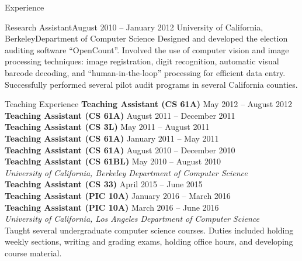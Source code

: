 \documentclass{resume}
\begin{document}
\begin{component}{Experience}
\vspace{-3.25em}

    \begin{position}{Research Assistant}{August 2010 -- January 2012}
        {University of California, Berkeley}{Department of Computer Science}
    {Designed and developed the election auditing software ``OpenCount''.
Involved the use of computer vision and image processing techniques: image registration, digit recognition, automatic visual barcode decoding, and ``human-in-the-loop'' processing for efficient data entry.
Successfully performed several pilot audit programs in several California counties.}
    \end{position}
    
\end{component}

\vspace{-1.5em}

\begin{component}{Teaching Experience}
    \textbf{Teaching Assistant (CS 61A)} \hfill May 2012 -- August 2012 \\
    \textbf{Teaching Assistant (CS 61A)} \hfill August 2011 -- December 2011 \\
    \textbf{Teaching Assistant (CS 3L)} \hfill May 2011 -- August 2011 \\
    \textbf{Teaching Assistant (CS 61A)} \hfill January 2011 -- May 2011 \\
    \textbf{Teaching Assistant (CS 61A)} \hfill August 2010 -- December 2010 \\
    \textbf{Teaching Assistant (CS 61BL)} \hfill May 2010 -- August 2010 \\
        \textit{University of California, Berkeley \hfill Department of Computer Science}\\
    \textbf{Teaching Assistant (CS 33)} \hfill April 2015 -- June 2015 \\
    \textbf{Teaching Assistant (PIC 10A)} \hfill January 2016 -- March 2016 \\
    \textbf{Teaching Assistant (PIC 10A)} \hfill March 2016 -- June 2016 \\
        \textit{University of California, Los Angeles \hfill Department of Computer Science}\\
    Taught several undergraduate computer science courses. Duties included holding weekly sections, writing and grading exams, holding office hours, and developing course material.
\end{component}
\end{document}
